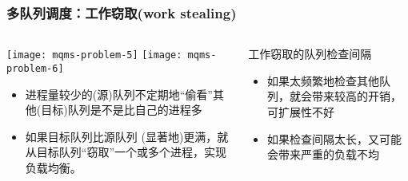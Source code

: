 \begin{frame}
	\frametitle{多队列调度：工作窃取(work stealing)}
	\begin{columns}
		\begin{column}{.5\textwidth}
			\Large \centering
			
			\texttt{[image: mqms-problem-5]}
			\texttt{[image: mqms-problem-6]}	
			
			\normalsize
			
			\begin{itemize}
				\item 进程量较少的(源)队列不定期地“偷看”其他(目标)队列是不是比自己的进程多
				\item 如果目标队列比源队列 (显著地)更满，就从目标队列“窃取”一个或多个进程，实现负载均衡。
				
			\end{itemize}

		
		\end{column}
			\pause		
		\begin{column}{.5\textwidth}
			工作窃取的队列检查间隔

			\normalsize
		
			\begin{itemize}
				\item 如果太频繁地检查其他队列，就会带来较高的开销，可扩展性不好
				\item 如果检查间隔太长，又可能会带来严重的负载不均
			\end{itemize}

			
		\end{column}
	\end{columns}
\end{frame}






